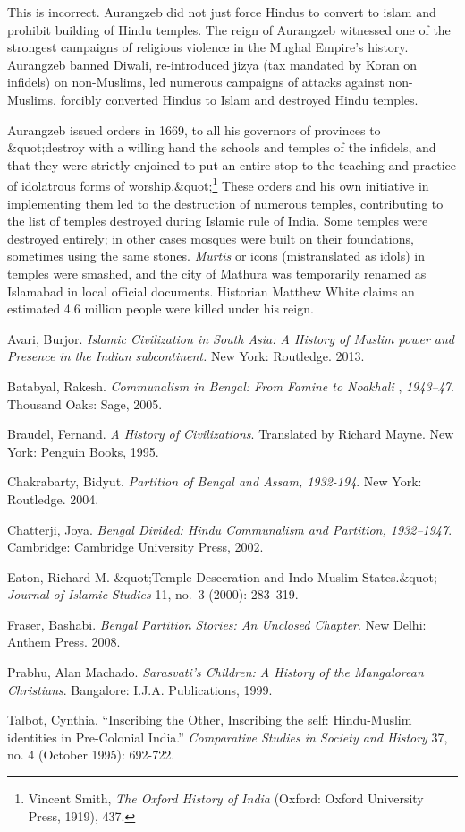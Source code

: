 This is incorrect. Aurangzeb did not just force Hindus to convert to islam and prohibit building of Hindu temples. The reign of Aurangzeb witnessed one of the strongest campaigns of religious violence in the Mughal Empire's history. Aurangzeb banned Diwali, re-introduced jizya (tax mandated by Koran on infidels) on non-Muslims, led numerous campaigns of attacks against non-Muslims, forcibly converted Hindus to Islam and destroyed Hindu temples.

Aurangzeb issued orders in 1669, to all his governors of provinces to &quot;destroy with a willing hand the schools and temples of the infidels, and that they were strictly enjoined to put an entire stop to the teaching and practice of idolatrous forms of worship.&quot;\footnote{Vincent Smith, \textit{The Oxford History of India} (Oxford: Oxford University Press, 1919), 437.} These orders and his own initiative in implementing them led to the destruction of numerous temples, contributing to the list of temples destroyed during Islamic rule of India. Some temples were destroyed entirely; in other cases mosques were built on their foundations, sometimes using the same stones. \textit{Murtis} or icons (mistranslated as idols) in temples were smashed, and the city of Mathura was temporarily renamed as Islamabad in local official documents. Historian Matthew White claims an estimated 4.6 million people were killed under his reign. 

\begin{thebibliography}{99}
 Avari, Burjor. \textit{Islamic Civilization in South Asia: A History of Muslim power and Presence in the Indian subcontinent.} New York: Routledge. 2013.

 Batabyal, Rakesh. \textit{Communalism in Bengal: From Famine to Noakhali} , \textit{1943--47}. Thousand Oaks: Sage, 2005. 

 Braudel, Fernand. \textit{A History of Civilizations}. Translated by Richard Mayne. New York: Penguin Books, 1995.

 Chakrabarty, Bidyut. \textit{Partition of Bengal and Assam, 1932-194}. New York: Routledge. 2004. 

 Chatterji, Joya. \textit{Bengal Divided: Hindu Communalism and Partition, 1932--1947}. Cambridge: Cambridge University Press, 2002.

 Eaton, Richard M. &quot;Temple Desecration and Indo-Muslim States.&quot; \textit{Journal of Islamic Studies} 11, no.\ 3 (2000): 283--319.

 Fraser, Bashabi. \textit{Bengal Partition Stories: An Unclosed Chapter}. New Delhi: Anthem Press. 2008. 

 Prabhu, Alan Machado. \textit{Sarasvati's Children: A History of the Mangalorean Christians}. Bangalore: I.J.A. Publications, 1999.

 Talbot, Cynthia. “Inscribing the Other, Inscribing the self: Hindu-Muslim identities in Pre-Colonial India.” \textit{Comparative Studies in Society and History} 37, no. 4 (October 1995): 692-722.
\end{thebibliography}
